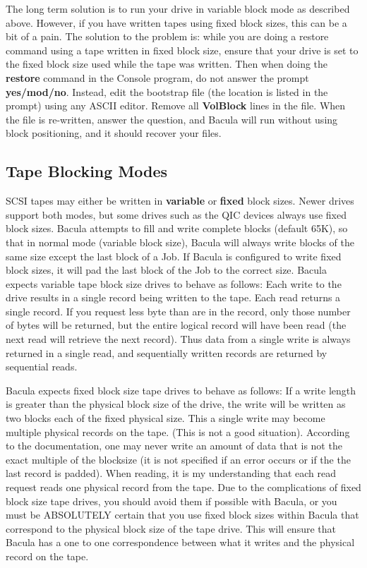 The long term solution is to run your drive in variable block mode as
described above. However, if you have written tapes using fixed block sizes,
this can be a bit of a pain. The solution to the problem is: while you are
doing a restore command using a tape written in fixed block size, ensure that
your drive is set to the fixed block size used while the tape was written.
Then when doing the {\bf restore} command in the Console program, do not
answer the prompt {\bf yes/mod/no}. Instead, edit the bootstrap file (the
location is listed in the prompt) using any ASCII editor. Remove all {\bf
VolBlock} lines in the file. When the file is re-written, answer the question,
and Bacula will run without using block positioning, and it should recover
your files. 
\label{BlockModes}

\subsection*{Tape Blocking Modes}

SCSI tapes may either be written in {\bf variable} or {\bf fixed} block sizes.
Newer drives support both modes, but some drives such as the QIC devices
always use fixed block sizes. Bacula attempts to fill and write complete
blocks (default 65K), so that in normal mode (variable block size), Bacula
will always write blocks of the same size except the last block of a Job. If
Bacula is configured to write fixed block sizes, it will pad the last block of
the Job to the correct size. Bacula expects variable tape block size drives to
behave as follows: Each write to the drive results in a single record being
written to the tape. Each read returns a single record. If you request less
byte than are in the record, only those number of bytes will be returned, but
the entire logical record will have been read (the next read will retrieve the
next record). Thus data from a single write is always returned in a single
read, and sequentially written records are returned by sequential reads. 

Bacula expects fixed block size tape drives to behave as follows: If a write
length is greater than the physical block size of the drive, the write will be
written as two blocks each of the fixed physical size. This a single write may
become multiple physical records on the tape. (This is not a good situation).
According to the documentation, one may never write an amount of data that is
not the exact multiple of the blocksize (it is not specified if an error
occurs or if the the last record is padded). When reading, it is my
understanding that each read request reads one physical record from the tape.
Due to the complications of fixed block size tape drives, you should avoid
them if possible with Bacula, or you must be ABSOLUTELY certain that you use
fixed block sizes within Bacula that correspond to the physical block size of
the tape drive. This will ensure that Bacula has a one to one correspondence
between what it writes and the physical record on the tape. 

